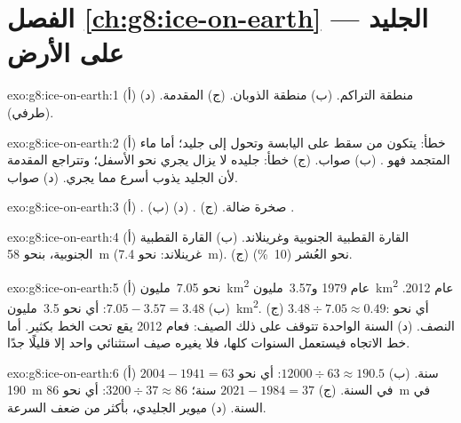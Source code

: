 \section*{الفصل \ref{ch:g8:ice-on-earth} --- الجليد على الأرض}

\begin{solution}{exo:g8:ice-on-earth:1}
(أ) منطقة التراكم. (ب) منطقة الذوبان. (ج) المقدمة. (د)  (طرفي).
\end{solution}

\begin{solution}{exo:g8:ice-on-earth:2}
(أ) خطأ: يتكون  من  سقط على اليابسة وتحول إلى جليد؛ أما ماء
 المتجمد فهو . (ب) صواب. (ج) خطأ: جليده لا يزال يجري نحو
الأسفل؛ وتتراجع المقدمة لأن الجليد يذوب أسرع مما يجري. (د)
صواب.
\end{solution}

\begin{solution}{exo:g8:ice-on-earth:3}
(أ) . (ب) صخرة ضالة. (ج) . (د) .
\end{solution}

\begin{solution}{exo:g8:ice-on-earth:4}
(أ) القارة القطبية الجنوبية وغرينلاند. (ب) القارة القطبية الجنوبية، بنحو
\qty{58}{m} (غرينلاند: نحو \qty{7.4}{m}). (ج) نحو العُشر (10~\%).
\end{solution}

\begin{solution}{exo:g8:ice-on-earth:5}
(أ) نحو \num{7.05}~مليون~\unit{km^2} عام 1979 و\num{3.57}~مليون~\unit{km^2}
عام 2012. (ب) $7.05 - 3.57 = 3.48$: أي نحو \num{3.5}~مليون~\unit{km^2}.
(ج) $3.48 \div 7.05 \approx 0.49$: أي نحو النصف. (د) السنة الواحدة تتوقف
على  ذلك الصيف: فعام 2012 يقع تحت الخط بكثير. أما خط الاتجاه فيستعمل
السنوات كلها، فلا يغيره صيف استثنائي واحد إلا قليلًا جدًا.
\end{solution}

\begin{solution}{exo:g8:ice-on-earth:6}
(أ) $2004 - 1941 = 63$ سنة. (ب) $12000 \div 63 \approx 190.5$: أي نحو
\qty{190}{m} في السنة. (ج) $2021 - 1984 = 37$ سنة؛ $3200 \div 37 \approx
86$: أي نحو \qty{86}{m} في السنة. (د)  ميوير الجليدي، بأكثر من ضعف السرعة.
\end{solution}

